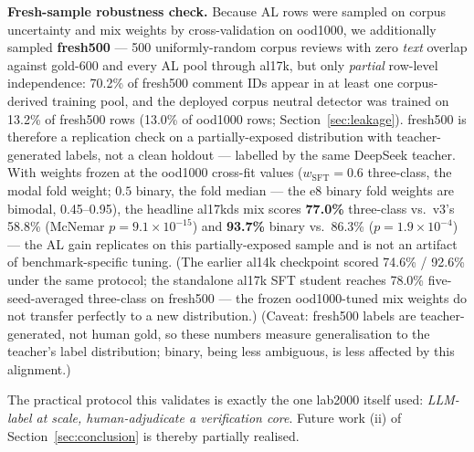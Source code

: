 \documentclass[11pt,a4paper]{article}
\begin{document}
\textbf{Fresh-sample robustness check.} Because AL rows were sampled
on corpus uncertainty and mix weights by cross-validation on ood1000,
we additionally sampled
\textbf{fresh500} --- 500 uniformly-random corpus reviews with zero
\emph{text} overlap against gold-600 and every AL pool through al17k,
but only \emph{partial} row-level independence: 70.2\% of fresh500
comment IDs appear in at least one corpus-derived training pool, and
the deployed corpus neutral detector was trained on 13.2\% of fresh500
rows (13.0\% of ood1000 rows; Section~\ref{sec:leakage}). fresh500 is
therefore a replication check on a partially-exposed distribution
with teacher-generated labels, not a clean holdout --- labelled by the
same
DeepSeek teacher. With weights frozen at the ood1000 cross-fit values
($w_{\mathrm{SFT}}{=}0.6$ three-class, the modal fold weight; $0.5$
binary, the fold median --- the e8 binary fold weights are bimodal,
0.45--0.95), the headline al17kds mix scores \textbf{77.0\%}
three-class vs.\ v3's 58.8\% (McNemar $p = 9.1\times10^{-15}$) and
\textbf{93.7\%} binary vs.\ 86.3\% ($p = 1.9\times10^{-4}$) --- the AL
gain replicates on this partially-exposed sample and is not an
artifact of
benchmark-specific tuning. (The earlier al14k checkpoint scored
74.6\% / 92.6\% under the same protocol; the standalone al17k SFT
student reaches 78.0\% five-seed-averaged three-class on fresh500
--- the frozen ood1000-tuned mix weights do not transfer perfectly
to a new distribution.) (Caveat: fresh500 labels are
teacher-generated, not human gold, so these numbers measure
generalisation to the teacher's label distribution; binary, being
less ambiguous, is less affected by this alignment.)

The practical protocol this validates is exactly the one lab2000
itself used: \emph{LLM-label at scale, human-adjudicate a verification
core}. Future work (ii) of Section~\ref{sec:conclusion} is thereby
partially realised.
\end{document}
